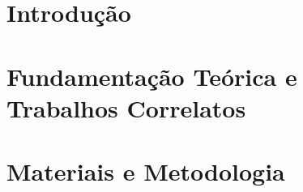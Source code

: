 \documentclass[
	12pt,		%
	a4paper,	%
	openright,  %
	oneside,	%
	chapter=TITLE,		%
	section=TITLE,		%
	english,	%
	brazilian   %
]{abntex2}
\begin{document}
%
\tableofcontents*
\newpage

\textual
\pagestyle{simple}


\chapter{Introdução}
\label{cap:introducao}


\chapter{Fundamentação Teórica e Trabalhos Correlatos}
\label{cap:fundamentacao}


\chapter{Materiais e Metodologia}
\label{cap:metodologia}

\end{document}
